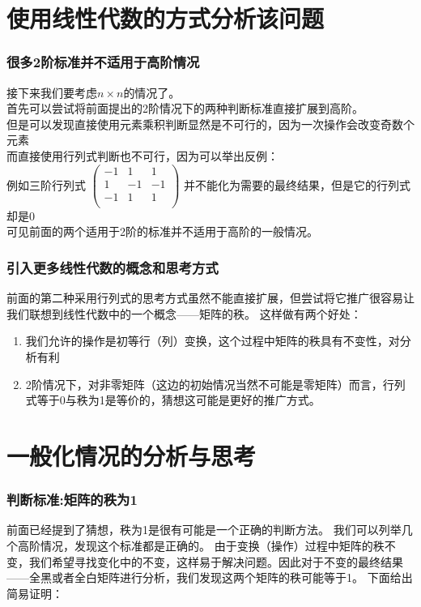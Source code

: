 \documentclass[UTF-8,a4paper]{ctexart}
\begin{document}
\part{使用线性代数的方式分析该问题}
\section{很多2阶标准并不适用于高阶情况}
接下来我们要考虑\(n \times n\)的情况了。\\
首先可以尝试将前面提出的2阶情况下的两种判断标准直接扩展到高阶。\\
但是可以发现直接使用元素乘积判断显然是不可行的，因为一次操作会改变奇数个元素\\
而直接使用行列式判断也不可行，因为可以举出反例：\\
\kaishu
例如三阶行列式
\(\begin{pmatrix}
    -1&1&1\\
    1&-1&-1\\
    -1&1&1\\
\end{pmatrix}\)
\quad
并不能化为需要的最终结果，但是它的行列式却是0\\
\songti
可见前面的两个适用于2阶的标准并不适用于高阶的一般情况。
\section{引入更多线性代数的概念和思考方式}
前面的第二种采用行列式的思考方式虽然不能直接扩展，但尝试将它推广很容易让我们联想到线性代数中的一个概念——矩阵的秩。
这样做有两个好处：
\kaishu
\begin{enumerate}
    \item 我们允许的操作是初等行（列）变换，这个过程中矩阵的秩具有不变性，对分析有利
    \item 2阶情况下，对非零矩阵（这边的初始情况当然不可能是零矩阵）而言，行列式等于0与秩为1是等价的，猜想这可能是更好的推广方式。
\end{enumerate}
\songti
\part{一般化情况的分析与思考}
\section{判断标准:矩阵的秩为1}
前面已经提到了猜想，秩为1是很有可能是一个正确的判断方法。
我们可以列举几个高阶情况，发现这个标准都是正确的。
由于变换（操作）过程中矩阵的秩不变，我们希望寻找变化中的不变，这样易于解决问题。因此对于不变的最终结果——全黑或者全白矩阵进行分析，我们发现这两个矩阵的秩可能等于1。
下面给出简易证明：
\end{document}
